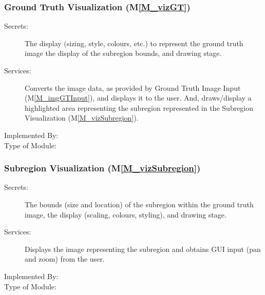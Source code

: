 \documentclass[12pt, titlepage]{article}
\newcommand{\mref}[1]{M\ref{#1}}
\begin{document}
\subsubsection{Ground Truth Visualization (\mref{M_vizGT})}
\begin{description}
\item[Secrets:]The display (sizing, style, colours, etc.) to represent the ground truth image
  the display of the subregion bounds, and drawing stage.
\item[Services:]Converts the image data, as provided by Ground Truth Image Input (\mref{M_imgGTInput}),
  and displays it to the user. And, draws/display a highlighted area representing the subregion
  represented in the Subregion Visualization (\mref{M_vizSubregion}).
\item[Implemented By:] \progname{}
\item[Type of Module:] 
\end{description}


\subsubsection{Subregion Visualization (\mref{M_vizSubregion})}
\begin{description}
\item[Secrets:]The bounds (size and location) of the subregion within the ground truth image,
  the display (scaling, colours, styling), and drawing stage.
\item[Services:]Displays the image representing the subregion and obtains GUI
  input (pan and zoom) from the user.
\item[Implemented By:] \progname{}
\item[Type of Module:] 
\end{description}
\end{document}
